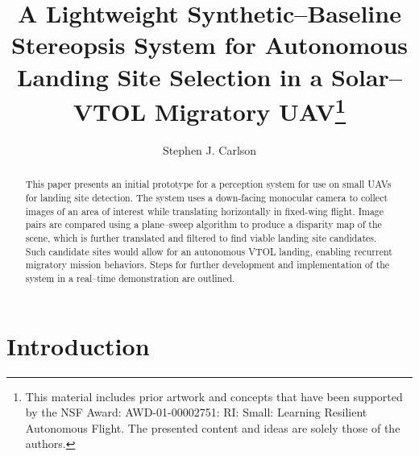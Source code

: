 \documentclass[runningheads]{llncs}
\begin{document}
%
\title{A Lightweight Synthetic--Baseline Stereopsis System for Autonomous Landing Site Selection in a Solar--VTOL Migratory UAV\thanks{This material includes prior artwork and concepts that have been supported by the NSF Award: AWD-01-00002751: RI: Small: Learning Resilient Autonomous Flight. The presented content and ideas are solely those of the authors.}}
%
%
\author{Stephen J. Carlson}
%
%
%
\maketitle              %
%
\begin{abstract}
This paper presents an initial prototype for a perception system for use on small UAVs for landing site detection. The system uses a down-facing monocular camera to collect images of an area of interest while translating horizontally in fixed-wing flight. Image pairs are compared using a plane--sweep algorithm to produce a disparity map of the scene, which is further translated and filtered to find viable landing site candidates. Such candidate sites would allow for an autonomous VTOL landing, enabling recurrent migratory mission behaviors. Steps for further development and implementation of the system in a real--time demonstration are outlined.

\end{abstract}



\section{Introduction}
\end{document}
